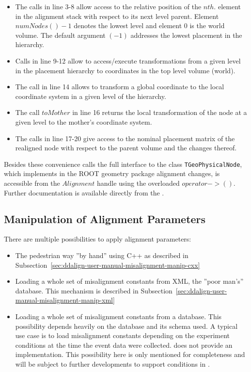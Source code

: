 \documentclass[10pt,a4paper]{article}
\begin{document}
\begin{itemize}\itemcompact
\item The calls in line 3-8 allow access to the relative position of the $nth.$ element
    in the alignment stack with respect to its next level parent. 
    Element $numNodes()-1$ denotes the lowest level and element $0$ is the world 
    volume. The default argument $(-1)$ addresses the lowest placement in the hierarchy.
\item Calls in line 9-12 allow to access/execute transformations from a given level
    in the placement hierarchy to coordinates in the top level volume (world).
\item The call in line 14 allows to transform a global coordinate to the local coordinate
    system in a given level of the hierarchy.
\item The call $toMother$ in line 16 returns the local transformation of the node at
    a given level to the mother's coordinate system.
\item The calls in line 17-20 give access to the nominal placement matrix of the realigned
    node with respect to the parent volume and the changes thereof.
\end{itemize}
Besides these convenience calls the full interface to the class {\tt TGeoPhysicalNode}, 
which implements in the ROOT geometry package alignment changes, is accessible 
from the $Alignment$ handle using the overloaded $operator->()$.
Further documentation is available directly from the .

\noindent
\subsection{Manipulation of Alignment Parameters}
\label{sec:ddalign-user-manual-misalignment-manip}
There are multiple possibilities to apply alignment parameters:
\begin{itemize}\itemcompact
\item The pedestrian way ''by hand'' using C++ as described in 
    Subsection~\ref{sec:ddalign-user-manual-misalignment-manip-cxx}
\item Loading a whole set of misalignment constants from XML, the ''poor man's'' database.
    This mechanism is described in
    Subsection~\ref{sec:ddalign-user-manual-misalignment-manip-xml}
\item Loading a whole set of misalignment constants from a database.
    This possibility depends heavily on the database and its schema used.
    A typical use case is to load misalignment constants depending on the
    experiment conditions at the time the event data were collected.
    \DDA does not provide an implementation.
    This possibility here is only mentioned for completeness and will be subject 
    to further developments to support conditions in \DDhep. 
\end{itemize}
\end{document}
